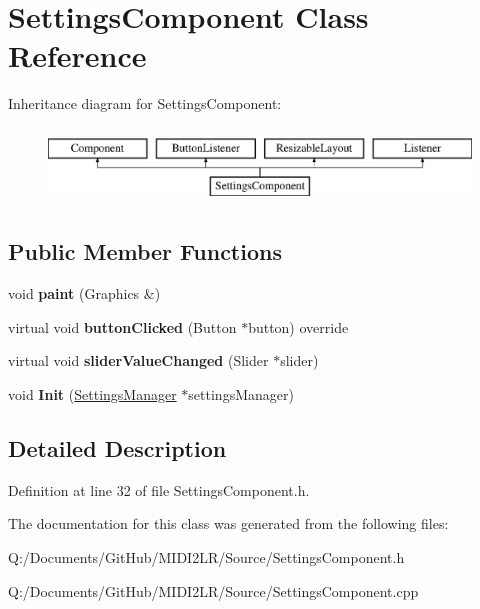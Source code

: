 \hypertarget{class_settings_component}{}\section{Settings\+Component Class Reference}
\label{class_settings_component}
Inheritance diagram for Settings\+Component\+:\begin{figure}[H]
\begin{center}
\leavevmode
\includegraphics[height=2.000000cm]{class_settings_component}
\end{center}
\end{figure}
\subsection*{Public Member Functions}
\begin{DoxyCompactItemize}
\item 
void {\bfseries paint} (Graphics \&)\hypertarget{class_settings_component_adac9fbbad0a4a9908008fd6ed49ee1e6}{}\label{class_settings_component_adac9fbbad0a4a9908008fd6ed49ee1e6}

\item 
virtual void {\bfseries button\+Clicked} (Button $\ast$button) override\hypertarget{class_settings_component_ad65a9529807a9ff304ba994399f55c55}{}\label{class_settings_component_ad65a9529807a9ff304ba994399f55c55}

\item 
virtual void {\bfseries slider\+Value\+Changed} (Slider $\ast$slider)\hypertarget{class_settings_component_a002bd22ab485b7179d4283bf325b6186}{}\label{class_settings_component_a002bd22ab485b7179d4283bf325b6186}

\item 
void {\bfseries Init} (\hyperlink{class_settings_manager}{Settings\+Manager} $\ast$settings\+Manager)\hypertarget{class_settings_component_a079ae41c21da9e0b617d91516e31a9f9}{}\label{class_settings_component_a079ae41c21da9e0b617d91516e31a9f9}

\end{DoxyCompactItemize}


\subsection{Detailed Description}


Definition at line 32 of file Settings\+Component.\+h.



The documentation for this class was generated from the following files\+:\begin{DoxyCompactItemize}
\item 
Q\+:/\+Documents/\+Git\+Hub/\+M\+I\+D\+I2\+L\+R/\+Source/Settings\+Component.\+h\item 
Q\+:/\+Documents/\+Git\+Hub/\+M\+I\+D\+I2\+L\+R/\+Source/Settings\+Component.\+cpp\end{DoxyCompactItemize}
